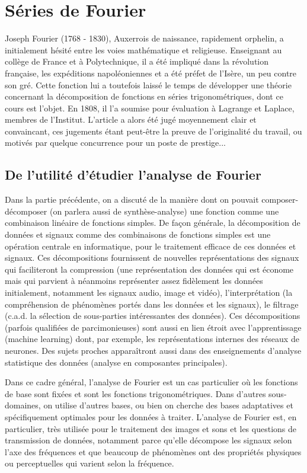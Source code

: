 


\chapter{Séries de Fourier}

Joseph Fourier (1768 - 1830), Auxerrois de naissance, rapidement
orphelin, a initialement hésité entre les voies mathématique et
religieuse. Enseignant au collège de France et à Polytechnique, il a
été impliqué dans la révolution française, les expéditions
napoléoniennes et a été préfet de l'Isère, un peu contre son
gré. Cette fonction lui a toutefois laissé le temps de développer une
théorie concernant la décomposition de fonctions en séries
trigonométriques, dont ce cours est l'objet. En  1808, il l'a soumise
pour évaluation à Lagrange et Laplace, membres de l'Institut. L'article a alors été jugé moyennement clair et convaincant, ces jugements étant peut-être la preuve de l'originalité du travail, ou motivés par quelque concurrence pour un poste de prestige...

\section{De l'utilité d'étudier l'analyse de Fourier}

Dans la partie précédente, on a discuté de la manière dont on pouvait composer-décomposer (on parlera aussi de synthèse-analyse) une fonction  comme une combinaison linéaire de fonctions simples. De façon générale, la décomposition de données et signaux comme des combinaisons de fonctions simples est une opération centrale en informatique, pour le traitement efficace de ces données et signaux. Ces décompositions fournissent de nouvelles représentations des signaux qui faciliteront la compression (une représentation des données qui est économe mais qui parvient à néanmoins représenter assez fidèlement les données initialement, notamment les signaux audio, image et vidéo), l'interprétation (la compréhension de phénomènes portés dans les données et les signaux), le filtrage (c.a.d. la sélection de sous-parties intéressantes des données). Ces décompositions (parfois qualifiées de parcimonieuses) sont aussi en lien étroit avec l'apprentissage (machine learning) dont, par exemple, les représentations internes des réseaux de neurones. Des sujets proches apparaîtront aussi dans des enseignements d'analyse statistique des données (analyse en composantes principales).

Dans ce cadre général, l'analyse de Fourier est un cas particulier où les fonctions de base sont fixées et sont les fonctions trigonométriques. Dans d'autres sous-domaines, on utilise d'autres bases, ou bien on cherche des bases adaptatives et spécifiquement optimales pour les données à traiter. L'analyse de Fourier est, en particulier, très utilisée pour le traitement des images et sons et les questions de transmission de données, notamment parce qu'elle décompose les signaux selon l'axe des fréquences et que beaucoup de phénomènes ont des propriétés physiques ou perceptuelles qui varient selon la fréquence.


